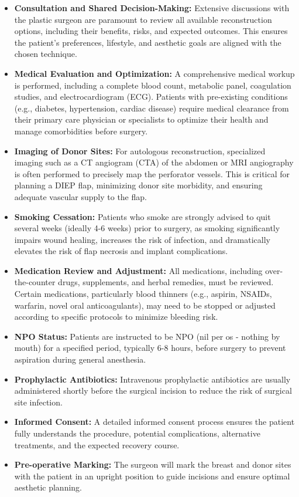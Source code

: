 \begin{itemize}
  \item \textbf{Consultation and Shared Decision-Making:} Extensive discussions with the plastic surgeon are paramount to review all available reconstruction options, including their benefits, risks, and expected outcomes. This ensures the patient's preferences, lifestyle, and aesthetic goals are aligned with the chosen technique.
  \item \textbf{Medical Evaluation and Optimization:} A comprehensive medical workup is performed, including a complete blood count, metabolic panel, coagulation studies, and electrocardiogram (ECG). Patients with pre-existing conditions (e.g., diabetes, hypertension, cardiac disease) require medical clearance from their primary care physician or specialists to optimize their health and manage comorbidities before surgery.
  \item \textbf{Imaging of Donor Sites:} For autologous reconstruction, specialized imaging such as a CT angiogram (CTA) of the abdomen or MRI angiography is often performed to precisely map the perforator vessels. This is critical for planning a DIEP flap, minimizing donor site morbidity, and ensuring adequate vascular supply to the flap.
  \item \textbf{Smoking Cessation:} Patients who smoke are strongly advised to quit several weeks (ideally 4-6 weeks) prior to surgery, as smoking significantly impairs wound healing, increases the risk of infection, and dramatically elevates the risk of flap necrosis and implant complications.
  \item \textbf{Medication Review and Adjustment:} All medications, including over-the-counter drugs, supplements, and herbal remedies, must be reviewed. Certain medications, particularly blood thinners (e.g., aspirin, NSAIDs, warfarin, novel oral anticoagulants), may need to be stopped or adjusted according to specific protocols to minimize bleeding risk.
  \item \textbf{NPO Status:} Patients are instructed to be NPO (nil per os - nothing by mouth) for a specified period, typically 6-8 hours, before surgery to prevent aspiration during general anesthesia.
  \item \textbf{Prophylactic Antibiotics:} Intravenous prophylactic antibiotics are usually administered shortly before the surgical incision to reduce the risk of surgical site infection.
  \item \textbf{Informed Consent:} A detailed informed consent process ensures the patient fully understands the procedure, potential complications, alternative treatments, and the expected recovery course.
  \item \textbf{Pre-operative Marking:} The surgeon will mark the breast and donor sites with the patient in an upright position to guide incisions and ensure optimal aesthetic planning.
\end{itemize}

